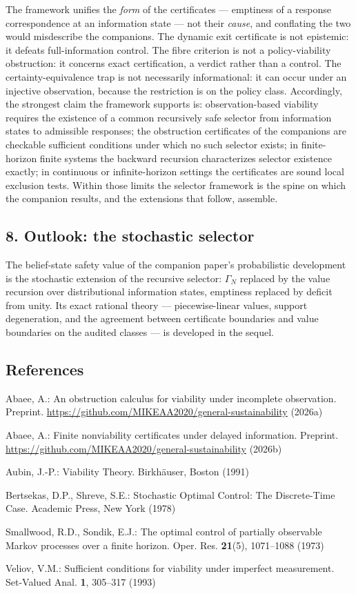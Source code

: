 \documentclass[10pt,twocolumn]{article}
\theoremstyle{definition}
\begin{document}
The framework unifies the \emph{form} of the certificates --- emptiness of a
response correspondence at an information state --- not their \emph{cause},
and conflating the two would misdescribe the companions. The dynamic exit
certificate is not epistemic: it defeats full-information control. The fibre
criterion is not a policy-viability obstruction: it concerns exact
certification, a verdict rather than a control. The certainty-equivalence
trap is not necessarily informational: it can occur under an injective
observation, because the restriction is on the policy class. Accordingly,
the strongest claim the framework supports is: observation-based viability
requires the existence of a common recursively safe selector from
information states to admissible responses; the obstruction certificates of
the companions are checkable sufficient conditions under which no such
selector exists; in finite-horizon finite systems the backward recursion
characterizes selector existence exactly; in continuous or infinite-horizon
settings the certificates are sound local exclusion tests. Within those
limits the selector framework is the spine on which the companion results,
and the extensions that follow, assemble.

\subsection{8. Outlook: the stochastic selector}\label{outlook}

The belief-state safety value of the companion paper's probabilistic
development is the stochastic extension of the recursive selector:
\(\Gamma_{N}\) replaced by the value recursion over distributional
information states, emptiness replaced by deficit from unity. Its exact
rational theory --- piecewise-linear values, support degeneration, and the
agreement between certificate boundaries and value boundaries on the audited
classes --- is developed in the sequel.

\subsection{References}\label{references}
{\footnotesize

Abaee, A.: An obstruction calculus for viability under incomplete
observation. Preprint.
\url{https://github.com/MIKEAA2020/general-sustainability} (2026a)

Abaee, A.: Finite nonviability certificates under delayed information.
Preprint. \url{https://github.com/MIKEAA2020/general-sustainability} (2026b)

Aubin, J.-P.: Viability Theory. Birkh\"auser, Boston (1991)

Bertsekas, D.P., Shreve, S.E.: Stochastic Optimal Control: The Discrete-Time
Case. Academic Press, New York (1978)

Smallwood, R.D., Sondik, E.J.: The optimal control of partially observable
Markov processes over a finite horizon. Oper. Res. \textbf{21}(5),
1071--1088 (1973)

Veliov, V.M.: Sufficient conditions for viability under imperfect
measurement. Set-Valued Anal. \textbf{1}, 305--317 (1993)

}
\end{document}
